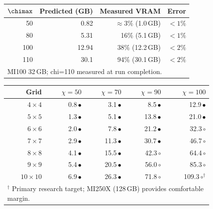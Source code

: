 \begin{figure}[ht]
\centering
{}
\label{tab:vram}
\smallskip
\begin{tabular}{rrrr}
\toprule
$\chimax$ & Predicted (GB) & Measured VRAM & Error \\
\midrule
 50 & 0.82  & $\approx 3\%$ (1.0\,GB)  & $< 1\%$ \\
 80 & 5.31  & 16\% (5.1\,GB)            & $< 1\%$ \\
100 & 12.94 & 38\% (12.2\,GB)           & $< 2\%$ \\
110 & 30.1  & 94\% (30.1\,GB)           & $< 2\%$ \\
\midrule
\multicolumn{4}{l}{MI100 32\,GB; chi=110 measured at run completion.} \\
\bottomrule
\end{tabular}
\bigskip
{}
\label{tab:vram_grid}
\smallskip
\begin{tabular}{r rrrr}
\toprule
Grid & $\chi=50$ & $\chi=70$ & $\chi=90$ & $\chi=100$ \\
\midrule
$4\times4$   & 0.8\,$\bullet$  &  3.1\,$\bullet$  &   8.5\,$\bullet$  &  12.9\,$\bullet$ \\
$5\times5$   & 1.3\,$\bullet$  &  5.1\,$\bullet$  &  13.8\,$\bullet$  &  21.0\,$\bullet$ \\
$6\times6$   & 2.0\,$\bullet$  &  7.8\,$\bullet$  &  21.2\,$\bullet$  &  32.3\,$\circ$   \\
$7\times7$   & 2.9\,$\bullet$  & 11.3\,$\bullet$  &  30.7\,$\bullet$  &  46.7\,$\circ$   \\
$8\times8$   & 4.1\,$\bullet$  & 15.5\,$\bullet$  &  42.3\,$\circ$    &  64.4\,$\circ$   \\
$9\times9$   & 5.4\,$\bullet$  & 20.5\,$\bullet$  &  56.0\,$\circ$    &  85.3\,$\circ$   \\
$10\times10$ & 6.9\,$\bullet$  & 26.3\,$\bullet$  &  71.8\,$\circ$    & 109.3\,$\circ$$^\dagger$ \\
\midrule
\multicolumn{5}{l}{$^\dagger$ Primary research target; MI250X (128\,GB) provides comfortable margin.} \\
\bottomrule
\end{tabular}
\end{figure}
